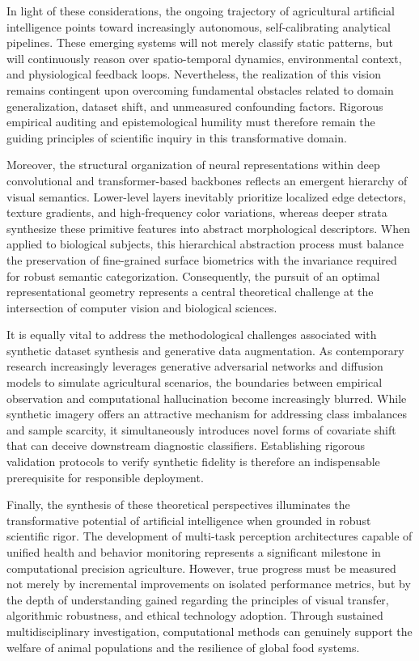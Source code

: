 \documentclass[Times,12pt,oneside,openany,print,index]{report}
\begin{document}
In light of these considerations, the ongoing trajectory of agricultural artificial intelligence points toward increasingly autonomous, self-calibrating analytical pipelines. These emerging systems will not merely classify static patterns, but will continuously reason over spatio-temporal dynamics, environmental context, and physiological feedback loops. Nevertheless, the realization of this vision remains contingent upon overcoming fundamental obstacles related to domain generalization, dataset shift, and unmeasured confounding factors. Rigorous empirical auditing and epistemological humility must therefore remain the guiding principles of scientific inquiry in this transformative domain.

Moreover, the structural organization of neural representations within deep convolutional and transformer-based backbones reflects an emergent hierarchy of visual semantics. Lower-level layers inevitably prioritize localized edge detectors, texture gradients, and high-frequency color variations, whereas deeper strata synthesize these primitive features into abstract morphological descriptors. When applied to biological subjects, this hierarchical abstraction process must balance the preservation of fine-grained surface biometrics with the invariance required for robust semantic categorization. Consequently, the pursuit of an optimal representational geometry represents a central theoretical challenge at the intersection of computer vision and biological sciences.

It is equally vital to address the methodological challenges associated with synthetic dataset synthesis and generative data augmentation. As contemporary research increasingly leverages generative adversarial networks and diffusion models to simulate agricultural scenarios, the boundaries between empirical observation and computational hallucination become increasingly blurred. While synthetic imagery offers an attractive mechanism for addressing class imbalances and sample scarcity, it simultaneously introduces novel forms of covariate shift that can deceive downstream diagnostic classifiers. Establishing rigorous validation protocols to verify synthetic fidelity is therefore an indispensable prerequisite for responsible deployment.

Finally, the synthesis of these theoretical perspectives illuminates the transformative potential of artificial intelligence when grounded in robust scientific rigor. The development of multi-task perception architectures capable of unified health and behavior monitoring represents a significant milestone in computational precision agriculture. However, true progress must be measured not merely by incremental improvements on isolated performance metrics, but by the depth of understanding gained regarding the principles of visual transfer, algorithmic robustness, and ethical technology adoption. Through sustained multidisciplinary investigation, computational methods can genuinely support the welfare of animal populations and the resilience of global food systems.
\end{document}
